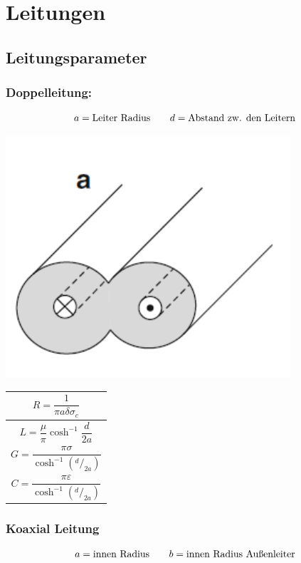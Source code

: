 \section{Leitungen}

\subsection{Leitungsparameter}

\subsubsection{Doppelleitung:}
\[
    a = \text{Leiter Radius} \qquad d = \text{Abstand zw. den Leitern} \\
\]

\includegraphics[width=0.4\columnwidth]{Figures/Doppelleitung.png}
{\renewcommand*{\arraystretch}{0.2}
\begin{tabularx}{0.5\columnwidth}{|X|}
    \hline
    \[R  = \frac{1}{\pi a\delta\sigma_c}\]              \\
    \hline
    \[L = \frac{\mu}{\pi} \cosh^{-1}\frac{d}{2a}\]      \\
    \hline
    \[G = \frac{\pi\sigma}{\cosh^{-1}(^d/_{2a})}\]      \\
    \hline
    \[C = \frac{\pi\varepsilon}{\cosh^{-1}(^d/_{2a})}\] \\
    \hline
\end{tabularx}}

\subsubsection{Koaxial Leitung}
\[
    a = \text{innen Radius} \qquad b = \text{innen Radius Außenleiter} \\
\]

